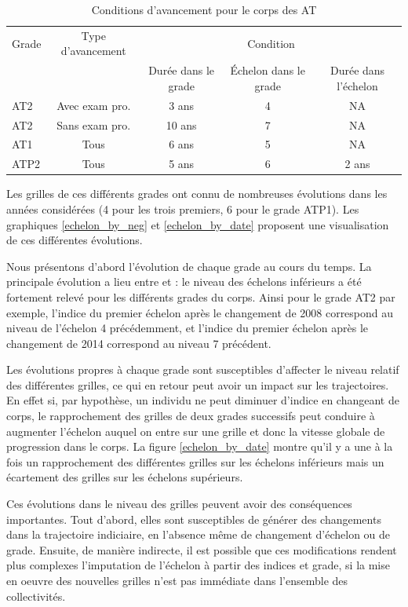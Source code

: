\documentclass[11pt,a4paper]{article}
\begin{document}
\begin{table}[h!]
\label{means}
\centering
\caption{Conditions d'avancement pour le corps des AT} 
\begin{tabular}{l|c|ccc}
\toprule
 Grade  & Type d'avancement&  \multicolumn{3}{c}{Condition}  \\
		&  				   &  Durée dans le grade	&  Échelon	dans le grade & Durée dans l'échelon \\
\midrule
AT2  &	Avec exam pro. 	&   3 ans  & 	4  & NA \\
AT2  &	Sans exam pro. 	& 	10 ans &	7  &	NA \\
AT1  & Tous				& 	6 ans  &	5  &	NA \\
ATP2 & Tous				& 	5 ans  &	6  &	2 ans  \\	
%	
\bottomrule
\end{tabular}
\end{table}

Les grilles de ces différents grades ont connu de nombreuses évolutions dans les années considérées (4 pour les trois premiers, 6 pour le grade ATP1). Les graphiques \ref{echelon_by_neg} et \ref{echelon_by_date} proposent une visualisation de ces différentes évolutions. 

Nous présentons d'abord l'évolution de chaque grade au cours du temps. La principale évolution a lieu entre et : le niveau des échelons inférieurs a été fortement relevé pour les différents grades du corps. Ainsi pour le grade AT2 par exemple, l'indice du premier échelon après le changement de 2008 correspond au niveau de l'échelon 4 précédemment, et l'indice du premier échelon après le changement de 2014 correspond au niveau 7 précédent. 

Les évolutions propres à chaque grade sont susceptibles d'affecter le niveau relatif des différentes grilles, ce qui en retour peut avoir un impact sur les trajectoires. En effet si, par hypothèse, un individu ne peut diminuer d'indice en changeant de corps, le rapprochement des grilles de deux grades successifs peut conduire à augmenter l'échelon auquel on entre sur une grille et donc la vitesse globale de progression dans le corps. La figure \ref{echelon_by_date} montre qu'il y a une à la fois un rapprochement des différentes grilles sur les échelons inférieurs mais un écartement des grilles sur les échelons supérieurs. 

\medskip

Ces évolutions dans le niveau des grilles peuvent avoir des conséquences importantes. Tout d'abord, elles sont susceptibles de générer des changements dans la trajectoire indiciaire, en l'absence même de changement d'échelon ou de grade. Ensuite, de manière indirecte, il est possible que ces modifications rendent plus complexes l'imputation de l'échelon à partir des indices et grade, si la mise en oeuvre des nouvelles grilles n'est pas immédiate dans l'ensemble des collectivités. 
\end{document}
